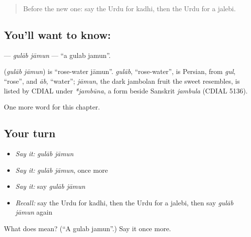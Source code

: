 \label{lesson:UR-C260-gulab-jamun}



\begin{quote}
Before the new one: say the Urdu for kadhi, then the Urdu for a jalebi.
\end{quote}

\subsection*{You'll want to know:  }
\textbf{ } — \emph{gulāb jāmun} — \textquotedblleft{}a gulab jamun\textquotedblright{}.

\begin{cousinweb}
\textbf{ } (\emph{gulāb jāmun}) is \textquotedblleft{}rose-water jāmun\textquotedblright{}. \emph{gulāb}, \textquotedblleft{}rose-water\textquotedblright{}, is Persian, from \emph{gul}, \textquotedblleft{}rose\textquotedblright{}, and \emph{āb}, \textquotedblleft{}water\textquotedblright{}; \emph{jāmun}, the dark jambolan fruit the sweet resembles, is listed by CDIAL under \emph{*jambūna}, a form beside Sanskrit \emph{jambula} (CDIAL 5136).
\end{cousinweb}

\begin{grammarlens}[title={What you've built}]
One more word for this chapter.
\end{grammarlens}

\subsection*{Your turn}
\begin{itemize}
\raggedright
  \item \emph{Say it:} \emph{gulāb jāmun}
  \item \emph{Say it:} \emph{gulāb jāmun}, once more
  \item \emph{Say it:} say \emph{gulāb jāmun}
  \item \emph{Recall:} say the Urdu for kadhi, then the Urdu for a jalebi, then say \emph{gulāb jāmun} again
\end{itemize}

\begin{tcolorbox}[breakable,colback=teal!4,colframe=teal!35!black,title={Before you move on}]
What does   mean? (\textquotedblleft{}A gulab jamun\textquotedblright{}.) Say it once more.
\end{tcolorbox}
